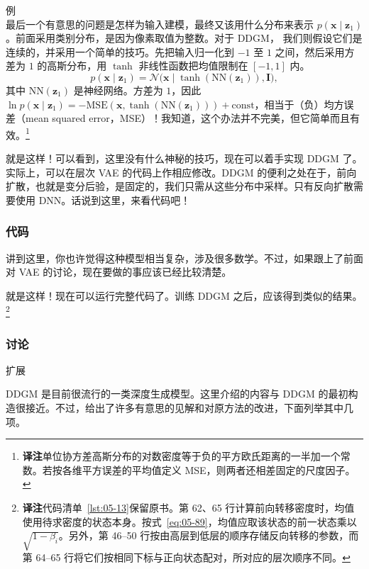 \begin{booknote}{例}
\begin{equation}
\tag{5.96}\label{eq:05-96}
\end{equation}
最后一个有意思的问题是怎样为输入建模，最终又该用什么分布来表示 $p(\mathbf{x}\mid\mathbf{z}_1)$。前面采用类别分布，是因为像素取值为整数。对于 DDGM，
我们则假设它们是连续的，并采用一个简单的技巧。先把输入归一化到 $-1$ 至 $1$ 之间，然后采用方差为 $1$ 的高斯分布，用 $\tanh$ 非线性函数把均值限制在 $[-1,1]$ 内。
\begin{equation}
p(\mathbf{x}\mid\mathbf{z}_1)=\mathcal{N}\bigl(\mathbf{x}\mid\tanh(\mathrm{NN}(\mathbf{z}_1)),\mathbf{I}\bigr),
\tag{5.97}\label{eq:05-97}
\end{equation}
其中 $\mathrm{NN}(\mathbf{z}_1)$ 是神经网络。方差为 $1$，因此 $\ln p(\mathbf{x}\mid\mathbf{z}_1)=-\mathrm{MSE}(\mathbf{x},\tanh(\mathrm{NN}(\mathbf{z}_1)))+\mathrm{const}$，相当于（负）均方误差（mean squared error，MSE）！我知道，这个办法并不完美，但它简单而且有效。\footnote{\textbf{译注}\quad 单位协方差高斯分布的对数密度等于负的平方欧氏距离的一半加一个常数。若按各维平方误差的平均值定义 MSE，则两者还相差固定的尺度因子。}
\end{booknote}

就是这样！可以看到，这里没有什么神秘的技巧，现在可以着手实现 DDGM 了。实际上，可以在层次 VAE 的代码上作相应修改。DDGM 的便利之处在于，前向扩散，也就是变分后验，是固定的，我们只需从这些分布中采样。只有反向扩散需要使用 DNN。话说到这里，来看代码吧！

\subsubsection{代码}
讲到这里，你也许觉得这种模型相当复杂，涉及很多数学。不过，如果跟上了前面对 VAE 的讨论，现在要做的事应该已经比较清楚。


就是这样！现在可以运行完整代码了。训练 DDGM 之后，应该得到类似的结果。\footnote{\textbf{译注}\quad 代码清单~\ref{lst:05-13}保留原书。第 62、65 行计算前向转移密度时，均值使用待求密度的状态本身。按式~\eqref{eq:05-89}，均值应取该状态的前一状态乘以 $\sqrt{1-\beta_i}$。另外，第 46--50 行按由高层到低层的顺序存储反向转移的参数，而第 64--65 行将它们按相同下标与正向状态配对，所对应的层次顺序不同。}

\subsubsection{讨论}
\noindent 扩展\par\smallskip
DDGM 是目前很流行的一类深度生成模型。这里介绍的内容与 DDGM 的最初构造很接近。不过，给出了许多有意思的见解和对原方法的改进，下面列举其中几项。

